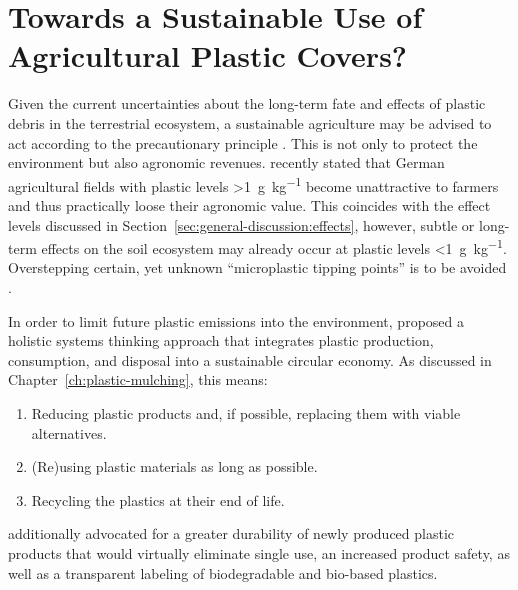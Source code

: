 \section{Towards a Sustainable Use of Agricultural Plastic Covers?}
\label{sec:general-discussion:sustainable}

Given the current uncertainties about the long-term fate and effects of plastic debris in the terrestrial ecosystem, a sustainable agriculture may be advised to act according to the precautionary principle \citep{RhodesPlastic2018,BackhausMicroplastics2020,MollerFinding2020}. This is not only to protect the environment but also agronomic revenues.  recently stated that German agricultural fields with plastic levels \SI{>1}{\gram\per\kilo\gram} become unattractive to farmers and thus practically loose their agronomic value. This coincides with the effect levels discussed in Section~\ref{sec:general-discussion:effects}, however, subtle or long-term effects on the soil ecosystem may already occur at plastic levels \SI{<1}{\gram\per\kilo\gram}. Overstepping certain, yet unknown ``microplastic tipping points'' is to be avoided \citep{QiBehavior2020}.

In order to limit future plastic emissions into the environment, \citet{ThompsonPlastics2009,ScalengheResource2018,RhodesPlastic2018} proposed a holistic systems thinking approach that integrates plastic production, consumption, and disposal into a sustainable circular economy. As discussed in Chapter~\ref{ch:plastic-mulching}, this means:

\begin{enumerate}
	\item Reducing plastic products and, if possible, replacing them with viable alternatives.
	\item (Re)using plastic materials as long as possible.
	\item Recycling the plastics at their end of life.
\end{enumerate}

 additionally advocated for a greater durability of newly produced plastic products that would virtually eliminate single use, an increased product safety, as well as a transparent labeling of biodegradable and bio-based plastics.

